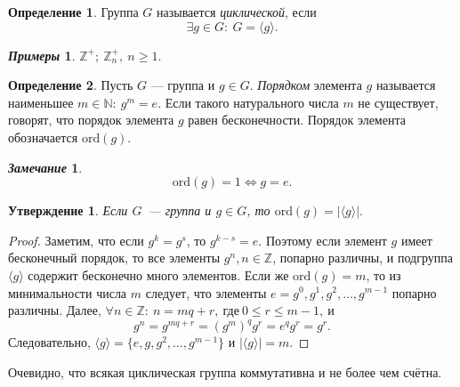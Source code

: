 \documentclass[a4paper, 14pt]{extarticle}
\newcommand{\integers}{\mathbb{Z}}
\newcommand{\naturals}{\mathbb{N}}
\newcommand{\ord}{\mathrm{ord}}
\newcommand{\suchthat}{{:}{ } \ }
\theoremstyle{definition}
\newtheorem*{exmpls}{\textit{Примеры}}
\newtheorem*{remark}{\textit{Замечание}}
\newtheorem{definition}{Определение}
\theoremstyle{plain}
\numberwithin{theorem}{section}
\numberwithin{definition}{section}
\newtheorem{statement}{Утверждение}
\numberwithin{statement}{section}
\numberwithin{lemma}{section}
\numberwithin{consequence}{section}
\begin{document}
	\begin{definition}
		Группа $G$ называется \textit{циклической}, если 
		\begin{equation*}
			\exists g \in G \suchthat G = \langle g \rangle.
		\end{equation*}
	\end{definition}
	\begin{exmpls}
		${\integers ^ +; \ \integers_n ^ +, \ n \geqslant 1.}$
	\end{exmpls}
	\begin{definition}
		Пусть $G$ — группа и ${g \in G}$. \textit{Порядком} элемента $g$ называется наименьшее ${m \in \naturals \suchthat g^m = e}$. Если такого натурального числа $m$ не существует, говорят, что порядок элемента $g$ равен бесконечности. Порядок элемента обозначается $\ord(g)$.
	\end{definition}
	\begin{remark}
		\begin{equation*}
			\ord(g) = 1 \Longleftrightarrow g = e.
		\end{equation*}
		
	\end{remark}
	\begin{statement}
		Если $G$~--- группа и $g \in G$, то $\ord(g) = |\langle g \rangle|.$
	\end{statement}
	\begin{proof}
		Заметим, что если $g^k = g^s$, то $g^{k - s} = e$. Поэтому если элемент $g$ имеет бесконечный порядок, то все элементы $g^n, n \in \integers$, попарно различны, и подгруппа $\langle g \rangle$ содержит бесконечно много элементов. 
		Если же ${\ord(g) = m}$, то из минимальности числа $m$ следует, что элементы ${e = g^0, g^1, g^2, \ldots , g^{m-1}}$ попарно различны.
		Далее, ${\forall n \in \integers{:} \ n = mq + r, \ \text{где} \ 0 \leqslant r \leq m - 1, \ \text{и}}$
		\begin{equation*}
			g^n = g^{mq + r} = (g^m)^q g^r = e^q g^r = g^r.
		\end{equation*}
		Следовательно, $\langle g \rangle = \{e, g, g^2, \ldots, g^{m - 1}\}$ и $|\langle g \rangle| = m.$
	\end{proof}
	Очевидно, что всякая циклическая группа коммутативна и не более чем счётна.
	\newpage
\end{document}
